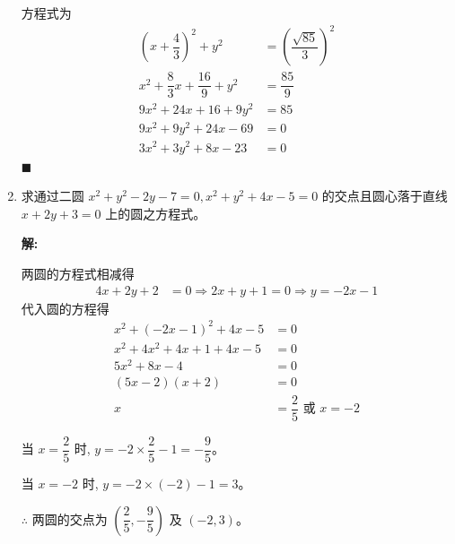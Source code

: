 \documentclass[10pt]{article}
\newcommand{\sol}{\textbf{解:} }
\begin{document}
\begin{enumerate}[leftmargin=*]
        方程式为
        \begin{align*}
          \left(x+\dfrac{4}{3}\right)^{2} + y^{2}       & = \left(\dfrac{\sqrt{85}}{3}\right)^{2} \\
          x^{2} + \dfrac{8}{3}x + \dfrac{16}{9} + y^{2} & = \dfrac{85}{9}                         \\
          9x^{2} + 24x + 16 + 9y^{2}                    & = 85                                    \\
          9x^{2} + 9y^{2} + 24x - 69                    & = 0                                     \\
          3x^{2} + 3y^{2} + 8x - 23                     & = 0
        \end{align*} \hfill$\blacksquare$

  \item 求通过二圆 $x^{2}+y^{2}-2 y-7=0, x^{2}+y^{2}+4 x-5=0$ 的交点且圆心落于直线 $x+2 y+3=0$ 上的圆之方程式。

        \sol{}

        两圆的方程式相减得
        \begin{align*}
          4x + 2y + 2 & = 0 \Rightarrow 2x + y + 1 = 0 \Rightarrow y = -2x - 1
        \end{align*}
        代入圆的方程得
        \begin{align*}
          x^2 + (-2x-1)^2 + 4x - 5     & = 0                              \\
          x^2 + 4x^2 + 4x + 1 + 4x - 5 & = 0                              \\
          5x^2 + 8x - 4                & = 0                              \\
          (5x - 2)(x + 2)              & = 0                              \\
          x                            & = \dfrac{2}{5} \text{ 或 } x = -2
        \end{align*}

        当 $x = \dfrac{2}{5}$ 时, $y = -2 \times \dfrac{2}{5} - 1 = -\dfrac{9}{5}$。

        当 $x = -2$ 时, $y = -2 \times (-2) - 1 = 3$。

        $\therefore$ 两圆的交点为 $\left(\dfrac{2}{5}, -\dfrac{9}{5}\right)$ 及 $(-2, 3)$。


\end{enumerate}
\end{document}

